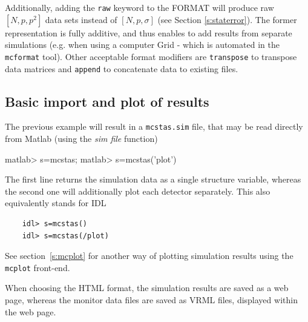 Additionally, adding the \texttt{raw} keyword to the FORMAT will produce raw
$[N, p, p^2]$ data sets instead of $[N, p, \sigma]$ (see Section
\ref{s:staterror}). The former representation is fully additive, and thus
enables to add results from separate simulations (e.g. when using a computer
Grid - which is automated in the \verb+mcformat+ tool). Other acceptable format
modifiers are \verb+transpose+ to transpose data matrices and \verb+append+ to
concatenate data to existing files.

\subsection{Basic import and plot of results}
\label{s:run-format}
The previous example will result in a \verb+mcstas.sim+ file, that may be read
directly from Matlab (using the {\it sim file} function)
\begin{matlab}
    matlab> s=mcstas;
    matlab> s=mcstas('plot')
\end{matlab} 
The first line returns the simulation data as a single structure variable,
whereas the second one will additionally plot each detector separately.  This
also equivalently stands for IDL 
\begin{lstlisting}
    idl> s=mcstas()
    idl> s=mcstas(/plot)
\end{lstlisting} 
See section~\ref{s:mcplot} for another way of plotting simulation results
using the \verb+mcplot+ front-end. 

When choosing the HTML format, the simulation results are saved as a web page,
whereas the monitor data files are saved as VRML files, displayed within the web
page.

